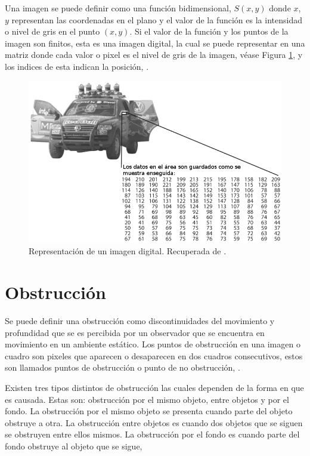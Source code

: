 Una imagen se puede definir como una función bidimensional, $S(x,y)$ donde $x$, $y$ representan las coordenadas en el plano y el valor de la función es la intensidad o nivel de gris en el punto $(x,y)$. 
Si el valor de la función y los puntos de la imagen son finitos, esta es una imagen digital, la cual se puede representar en una matriz donde cada valor o pixel es el nivel de gris de la imagen, véase Figura \ref{fig:image}, y los indices de esta indican la posición, \citep{Gonzalez2002}. 

\begin{figure}[h!]
\begin{center}
\includegraphics[scale=.50]{./Figures/image.png}
\end{center}
\caption{Representación de un imagen digital. Recuperada de \protect\citep{Shin2013}. }
\label{fig:image}
\end{figure}




\section{Obstrucción}\label{OclusionDef} 

Se puede definir una obstrucción como discontinuidades del movimiento y profundidad que se es percibida por un observador que se encuentra en movimiento en un ambiente estático.
Los puntos de obstrucción en una imagen o cuadro son pixeles que aparecen o desaparecen en dos cuadros consecutivos, estos son llamados puntos de obstrucción o punto de no obstrucción, \citep{Silva2001}.  

Existen tres tipos distintos de obstrucción las cuales dependen de la forma en que es causada. Estas son: obstrucción por el mismo objeto, entre objetos y por el fondo. La obstrucción por el mismo objeto se presenta cuando parte del objeto obstruye a otra. La obstrucción entre objetos es cuando dos objetos que se siguen se obstruyen entre ellos mismos. La obstrucción por el fondo es cuando parte del fondo obstruye al objeto que se sigue, \citep{YilmazA.JavedO.andShah2006}


